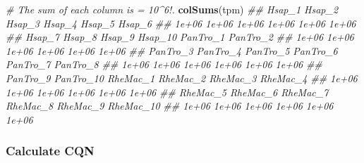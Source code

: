 \documentclass[]{book}
\newenvironment{Shaded}{\begin{snugshade}}{\end{snugshade}}
\newcommand{\CommentTok}[1]{\textcolor[rgb]{0.56,0.35,0.01}{\textit{#1}}}
\newcommand{\KeywordTok}[1]{\textcolor[rgb]{0.13,0.29,0.53}{\textbf{#1}}}
\newcommand{\NormalTok}[1]{#1}
\begin{document}
\begin{Shaded}
\begin{Highlighting}[]
\CommentTok{# The sum of each column is = 10^6!.}
\KeywordTok{colSums}\NormalTok{(tpm)}
\CommentTok{##    Hsap_1    Hsap_2    Hsap_3    Hsap_4    Hsap_5    Hsap_6 }
\CommentTok{##     1e+06     1e+06     1e+06     1e+06     1e+06     1e+06 }
\CommentTok{##    Hsap_7    Hsap_8    Hsap_9   Hsap_10  PanTro_1  PanTro_2 }
\CommentTok{##     1e+06     1e+06     1e+06     1e+06     1e+06     1e+06 }
\CommentTok{##  PanTro_3  PanTro_4  PanTro_5  PanTro_6  PanTro_7  PanTro_8 }
\CommentTok{##     1e+06     1e+06     1e+06     1e+06     1e+06     1e+06 }
\CommentTok{##  PanTro_9 PanTro_10  RheMac_1  RheMac_2  RheMac_3  RheMac_4 }
\CommentTok{##     1e+06     1e+06     1e+06     1e+06     1e+06     1e+06 }
\CommentTok{##  RheMac_5  RheMac_6  RheMac_7  RheMac_8  RheMac_9 RheMac_10 }
\CommentTok{##     1e+06     1e+06     1e+06     1e+06     1e+06     1e+06}
\end{Highlighting}
\end{Shaded}

\hypertarget{calculate-cqn}{%
\subsubsection{Calculate CQN}\label{calculate-cqn}}
\end{document}
